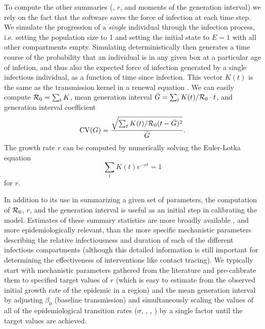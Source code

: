 \documentclass[12pt]{article}\usepackage[]{graphicx}\usepackage[]{color}
\begin{document}
To compute the other summaries (\Rzero, $r$, and moments of the generation interval) we rely on the fact that the software saves the force of infection at each time step. 
We simulate the progression of a \emph{single} individual through the infection process, i.e. setting the population size to 1 and setting the initial state to $E=1$ with all other compartments empty. 
Simulating deterministically then generates a time course of the probability that an individual is in any given box at a particular age of infetion, and thus also the expected force of infection generated by a single infectious individual, as a function of time since infection. 
This vector $K(t)$ is the same as the transmission kernel in a renewal equation \cite{Cham+18}. 
We can easily compute ${\mathcal R}_0 = \sum_t K$, mean generation interval  $\bar G = \sum_t K(t)/{\mathcal R}_0 \cdot t$, and generation interval coefficient
\[
\textrm{CV}(G) = \frac{\sqrt{\sum_t K(t)/{\mathcal R}_0 (t- \bar G)^2}}{\bar G} .
\]
The growth rate $r$ can be computed by numerically solving the Euler-Lotka equation
\[
\sum_t  K(t) e^{-r t} = 1
\]
for $r$.





In addition to its use in summarizing a given set of parameters, the computation of ${\mathcal R}_0$, $r$, and the generation interval is useful as an initial step in calibrating the model. 
Estimates of these summary statistics are more broadly available \cite{park2020reconciling} , and more epidemiologically relevant, than the more specific mechanistic parameters describing the relative infectiousness and duration of each of the different infectious compartments (although this detailed information is still important for determining the effectiveness of interventions like contact tracing). 
We typically start with mechanistic parameters gathered from the literature and pre-calibrate them to specified target values of $r$ (which is easy to estimate from the observed initial growth rate of the epidemic in a region) and the mean generation interval by adjusting $\beta_0$ (baseline transmission) and simultaneously scaling the values of all of the epidemiological transition rates ($\sigma$, , , ) by a single factor until the target values are achieved.
\end{document}
